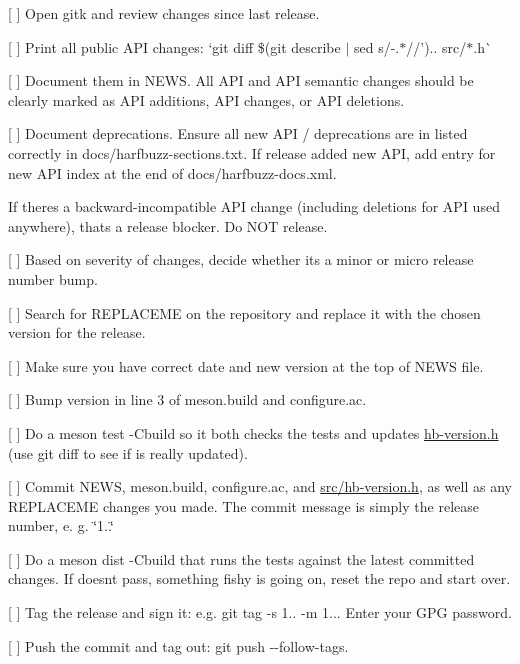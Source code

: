 
\begin{DoxyItemize}
\item \mbox{[} \mbox{]} Open gitk and review changes since last release.
\begin{DoxyItemize}
\item \mbox{[} \mbox{]} Print all public API changes\+: `git diff \$(git describe $\vert$ sed \textquotesingle{}s/-\/.$\ast$//').. src/$\ast$.h\`{}
\item \mbox{[} \mbox{]} Document them in NEWS. All API and API semantic changes should be clearly marked as API additions, API changes, or API deletions.
\item \mbox{[} \mbox{]} Document deprecations. Ensure all new API / deprecations are in listed correctly in docs/harfbuzz-\/sections.\+txt. If release added new API, add entry for new API index at the end of docs/harfbuzz-\/docs.\+xml.

If there\textquotesingle{}s a backward-\/incompatible API change (including deletions for API used anywhere), that\textquotesingle{}s a release blocker. Do NOT release.
\end{DoxyItemize}
\item \mbox{[} \mbox{]} Based on severity of changes, decide whether it\textquotesingle{}s a minor or micro release number bump.
\item \mbox{[} \mbox{]} Search for REPLACEME on the repository and replace it with the chosen version for the release.
\item \mbox{[} \mbox{]} Make sure you have correct date and new version at the top of NEWS file.
\item \mbox{[} \mbox{]} Bump version in line 3 of meson.\+build and configure.\+ac.
\item \mbox{[} \mbox{]} Do a {\ttfamily meson test -\/Cbuild} so it both checks the tests and updates \mbox{\hyperlink{hb-version_8h_source}{hb-\/version.\+h}} (use {\ttfamily git diff} to see if is really updated).
\item \mbox{[} \mbox{]} Commit NEWS, meson.\+build, configure.\+ac, and \mbox{\hyperlink{hb-version_8h_source}{src/hb-\/version.\+h}}, as well as any REPLACEME changes you made. The commit message is simply the release number, e. g. \char`\"{}1..\char`\"{}
\item \mbox{[} \mbox{]} Do a {\ttfamily meson dist -\/Cbuild} that runs the tests against the latest committed changes. If doesn\textquotesingle{}t pass, something fishy is going on, reset the repo and start over.
\item \mbox{[} \mbox{]} Tag the release and sign it\+: e.\+g. {\ttfamily git tag -\/s 1.. -\/m 1..}. Enter your GPG password.
\item \mbox{[} \mbox{]} Push the commit and tag out\+: {\ttfamily git push -\/-\/follow-\/tags}. 
\end{DoxyItemize}